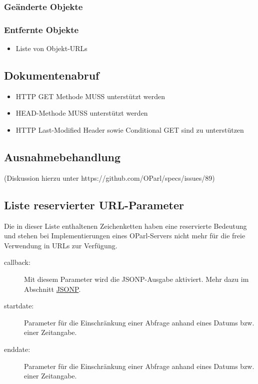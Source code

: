 \documentclass[,a4paper]{article}
\begin{document}
\subsubsection{Geänderte Objekte}

\subsubsection{Entfernte Objekte}

\begin{itemize}
\item
  Liste von Objekt-URLs
\end{itemize}

\subsection{Dokumentenabruf}

\begin{itemize}
\item
  HTTP GET Methode MUSS unterstützt werden
\item
  HEAD-Methode MUSS unterstützt werden
\item
  HTTP Last-Modified Header sowie Conditional GET sind zu unterstützen
\end{itemize}

\subsection{Ausnahmebehandlung}

(Diskussion hierzu unter https://github.com/OParl/specs/issues/89)

\subsection{Liste reservierter URL-Parameter}

Die in dieser Liste enthaltenen Zeichenketten haben eine reservierte
Bedeutung und stehen bei Implementierungen eines OParl-Servers nicht
mehr für die freie Verwendung in URLs zur Verfügung.

\begin{description}
\item[callback:]
Mit diesem Parameter wird die JSONP-Ausgabe aktiviert. Mehr dazu im
Abschnitt \hyperref[jsonp]{JSONP}.
\item[startdate:]
Parameter für die Einschränkung einer Abfrage anhand eines Datums bzw.
einer Zeitangabe.
\item[enddate:]
Parameter für die Einschränkung einer Abfrage anhand eines Datums bzw.
einer Zeitangabe.
\end{description}
\end{document}
